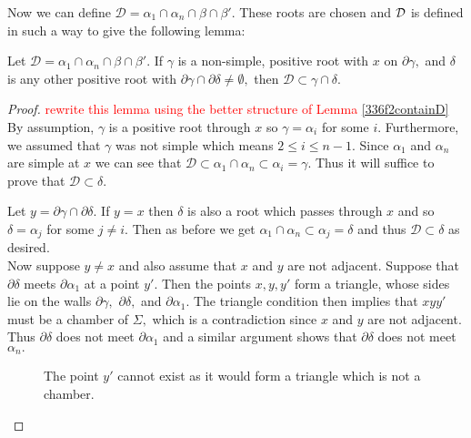 \documentclass[class=book, crop=false,12 pt]{standalone}
\begin{document}
Now we can define $\mathcal{D}=\alpha_1\cap \alpha_n \cap \beta\cap \beta'.$ These roots are chosen and $\mathcal{D}$ is defined in such a way to give the following lemma:

\begin{lemma}
	Let $\mathcal{D}=\alpha_1\cap \alpha_n \cap \beta\cap \beta'.$ If $\gamma$ is a non-simple, positive root with $x$ on $\partial \gamma,$ and $\delta$ is any other positive root with $\partial \gamma \cap \partial \delta \neq \emptyset,$ then $\mathcal{D}\subset \gamma \cap \delta.$ \label{containD}
\end{lemma}
\begin{proof}
	\textcolor{red}{rewrite this lemma using the better structure of Lemma \ref{336f2containD}}\\
	By assumption, $\gamma$ is a positive root through $x$ so $\gamma=\alpha_i$ for some $i.$ Furthermore, we assumed that $\gamma$ was not simple which means $2\le i \le n-1.$ Since $\alpha_1$ and $\alpha_n$ are simple at $x$ we can see that $\mathcal{D}\subset \alpha_1\cap \alpha_n\subset \alpha_i=\gamma.$ Thus it will suffice to prove that $\mathcal{D}\subset \delta.$

	Let $y=\partial\gamma \cap \partial \delta.$ If $y=x$ then $\delta$ is also a root which passes through $x$ and so $\delta=\alpha_j$ for some $j\neq i.$ Then as before we get $\alpha_1\cap \alpha_n\subset \alpha_j=\delta$ and thus $\mathcal{D}\subset \delta$ as desired.\\

Now suppose $y\neq x$ and also assume that $x$ and $y$ are not adjacent. Suppose that $\partial \delta$ meets $\partial \alpha_1$ at a point $y'.$ Then the points $x,y,y'$ form a triangle, whose sides lie on the walls $\partial \gamma,$ $\partial \delta,$ and $\partial \alpha_1.$ The triangle condition then implies that $xyy'$ must be a chamber of $\Sigma,$ which is a contradiction since $x$ and $y$ are not adjacent. Thus $\partial \delta$ does not meet $\partial \alpha_1$ and a similar argument shows that $\partial \delta$ does not meet $\alpha_n.$ 

\begin{figure}[h]
\label{impossibletriangle}
\begin{center}
	\caption{The point $y'$ cannot exist as it would form a triangle which is not a chamber.}
\end{center}
\end{figure}



\end{proof}
\end{document}

